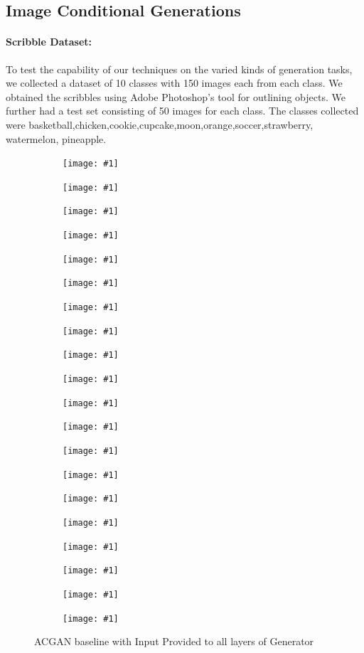 \subsection{Image Conditional Generations}

\paragraph{Scribble Dataset:}
To test the capability of our techniques on the varied kinds of generation tasks, we collected a dataset of 10 classes with 150 images each from each class. We obtained the scribbles using Adobe Photoshop's tool for outlining objects. We further had a test set consisting of 50 images for each class. The classes collected were basketball,chicken,cookie,cupcake,moon,orange,soccer,strawberry, watermelon, pineapple. 

\newcommand{\addSubFigTenth}[3]{\begin{subfigure}[t]{.16\linewidth}
   \texttt{[image: \#1]}
   \caption{#2}\label{#3}\end{subfigure}
}

\begin{figure}%
    \centering
    \addSubFigTenth{acgan_baseline_all/basketball_11_real_A}{}{fig:basketball_scribble} 
    \addSubFigTenth{acgan_baseline_all/chicken_2_real_A}{}{fig:chicken_scribble} 
    \addSubFigTenth{acgan_baseline_all/cookie_13_real_A}{}{fig:cookie_scribble}
    \addSubFigTenth{acgan_baseline_all/cupcake_27_real_A}{}{fig:cupcake_scribble}
    \addSubFigTenth{acgan_baseline_all/moon_15_real_A}{}{fig:moon_scribble}
    \addSubFigTenth{acgan_baseline_all/basketball_11_fake_B}{}{fig:basketball_img} 
    \addSubFigTenth{acgan_baseline_all/chicken_2_fake_B}{}{fig:chicken_img} 
    \addSubFigTenth{acgan_baseline_all/cookie_13_fake_B}{}{fig:cookie_img}
    \addSubFigTenth{acgan_baseline_all/cupcake_27_fake_B}{}{fig:cupcake_img}
    \addSubFigTenth{acgan_baseline_all/moon_15_fake_B}{}{fig:moon_img}
    \addSubFigTenth{acgan_baseline_all/orange_17_real_A}{}{fig:orange_scribble} 
    \addSubFigTenth{acgan_baseline_all/pineapple_2_real_A}{}{fig:pineapple_scribble} 
    \addSubFigTenth{acgan_baseline_all/soccer_18_real_A}{}{fig:soccer_scribble}
    \addSubFigTenth{acgan_baseline_all/strawberry_1_real_A}{}{fig:strawberry_scribble}
    \addSubFigTenth{acgan_baseline_all/watermelon_17_real_A}{}{fig:watermelon_scribble}
    \addSubFigTenth{acgan_baseline_all/orange_17_fake_B}{}{fig:orange_img} 
    \addSubFigTenth{acgan_baseline_all/pineapple_2_fake_B}{}{fig:pineapple_img} 
    \addSubFigTenth{acgan_baseline_all/soccer_18_fake_B}{}{fig:soccer_img}
    \addSubFigTenth{acgan_baseline_all/strawberry_1_fake_B}{}{fig:strawberry_img}
    \addSubFigTenth{acgan_baseline_all/watermelon_17_fake_B}{}{fig:watermelon_img}
    \caption{ACGAN baseline with Input Provided to all layers of Generator}
    \label{fig:scribble_pix2pix}
    \vspace{-3mm}
\end{figure}


